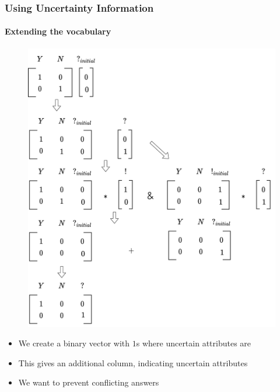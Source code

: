 \documentclass[9pt]{beamer}
\begin{document}
\begin{frame}
\frametitle{Using Uncertainty Information}
\framesubtitle{Extending the vocabulary}
\begin{figure}
	\includegraphics[width=0.5\linewidth]{images/extended_vocab.pdf}
\end{figure}
\begin{itemize}
	\item We create a binary vector with $1$s where uncertain attributes are
	\item This gives an additional column, indicating uncertain attributes
	\item We want to prevent conflicting answers
\end{itemize}
\end{frame}
\end{document}
